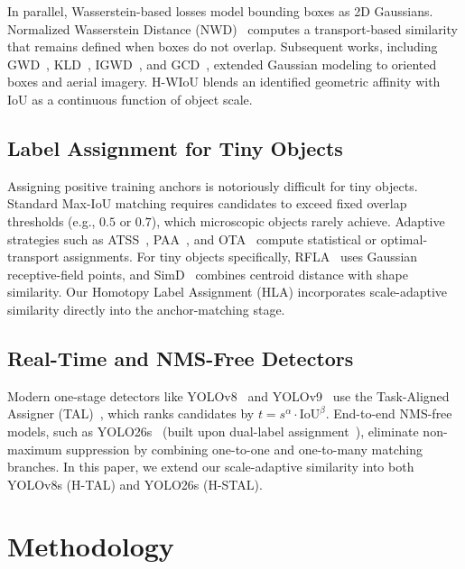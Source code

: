 \documentclass[11pt,a4paper]{article}
\begin{document}
In parallel, Wasserstein-based losses model bounding boxes as 2D Gaussians. Normalized Wasserstein Distance (NWD)~\cite{wang2021nwd,xu2022aitodv2nwd} computes a transport-based similarity that remains defined when boxes do not overlap. Subsequent works, including GWD~\cite{yang2021gwd}, KLD~\cite{yang2021kld}, IGWD~\cite{hu2025cfenet}, and GCD~\cite{guan2025gcd}, extended Gaussian modeling to oriented boxes and aerial imagery. H-WIoU blends an identified geometric affinity with IoU as a continuous function of object scale.

\subsection{Label Assignment for Tiny Objects}
Assigning positive training anchors is notoriously difficult for tiny objects. Standard Max-IoU matching requires candidates to exceed fixed overlap thresholds (e.g., $0.5$ or $0.7$), which microscopic objects rarely achieve. Adaptive strategies such as ATSS~\cite{zhang2020atss}, PAA~\cite{kim2020paa}, and OTA~\cite{ge2021ota} compute statistical or optimal-transport assignments. For tiny objects specifically, RFLA~\cite{xu2022rfla} uses Gaussian receptive-field points, and SimD~\cite{shi2024simd} combines centroid distance with shape similarity. Our Homotopy Label Assignment (HLA) incorporates scale-adaptive similarity directly into the anchor-matching stage.

\subsection{Real-Time and NMS-Free Detectors}
Modern one-stage detectors like YOLOv8~\cite{jocher2023yolo} and YOLOv9~\cite{wang2024yolov9} use the Task-Aligned Assigner (TAL)~\cite{feng2021tood}, which ranks candidates by $t = s^\alpha \cdot \mathrm{IoU}^\beta$. End-to-end NMS-free models, such as YOLO26s~\cite{ultralytics2026yolo26} (built upon dual-label assignment~\cite{wang2024yolov10}), eliminate non-maximum suppression by combining one-to-one and one-to-many matching branches. In this paper, we extend our scale-adaptive similarity into both YOLOv8s (H-TAL) and YOLO26s (H-STAL).


\section{Methodology}
\end{document}
